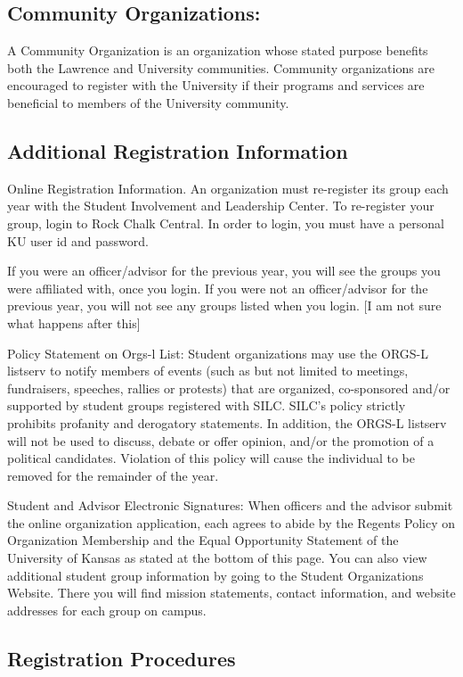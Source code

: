 \subsection*{Community Organizations:}
A Community Organization is an organization whose stated purpose benefits both
the Lawrence and University communities. Community organizations are encouraged
to register with the University if their programs and services are beneficial to
members of the University community.

\subsection{Additional Registration Information}

Online Registration Information. An organization must re-register its group each
year with the Student Involvement and Leadership Center. To re-register your
group, login to Rock Chalk Central. In order to login, you must have a personal
KU user id and password.

If you were an officer/advisor for the previous year, you will see the groups
you were affiliated with, once you login.
If you were not an officer/advisor for the previous year, you will not see any
groups listed when you login. [I am not sure what happens after this]

Policy Statement on Orgs-l List:  Student organizations may use the ORGS-L
listserv to notify members of events (such as but not limited to meetings,
fundraisers, speeches, rallies or protests) that are organized, co-sponsored
and/or supported by student groups registered with SILC.  SILC's policy strictly
prohibits profanity and derogatory statements.  In addition, the ORGS-L listserv
will not be used to discuss, debate or offer opinion, and/or the promotion of a
political candidates. Violation of this policy will cause the individual to be
removed for the remainder of the year.

Student and Advisor Electronic Signatures: When officers and the advisor submit
the online organization application, each agrees to abide by the Regents Policy
on Organization Membership and the Equal Opportunity Statement of the University
of Kansas as stated at the bottom of this page. You can also view additional
student group information by going to the Student Organizations Website. There
you will find mission statements, contact information, and website addresses for
each group on campus.

\subsection{Registration Procedures}


